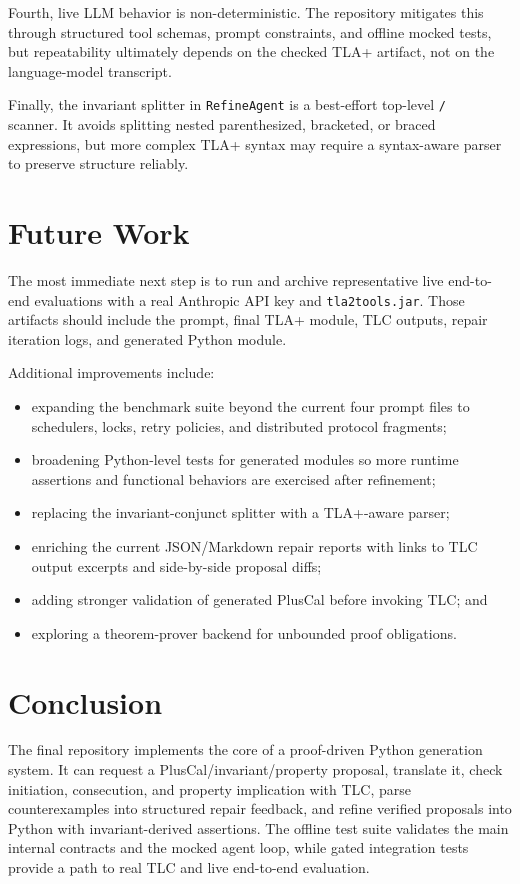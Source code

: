 \documentclass[11pt]{article}
\begin{document}
Fourth, live LLM behavior is non-deterministic. The repository mitigates this
through structured tool schemas, prompt constraints, and offline mocked tests,
but repeatability ultimately depends on the checked TLA+ artifact, not on the
language-model transcript.

Finally, the invariant splitter in \texttt{RefineAgent} is a best-effort
top-level \texttt{/\\} scanner. It avoids splitting nested parenthesized,
bracketed, or braced expressions, but more complex TLA+ syntax may require a
syntax-aware parser to preserve structure reliably.

\section{Future Work}

The most immediate next step is to run and archive representative live
end-to-end evaluations with a real Anthropic API key and \texttt{tla2tools.jar}.
Those artifacts should include the prompt, final TLA+ module, TLC outputs,
repair iteration logs, and generated Python module.

Additional improvements include:

\begin{itemize}[leftmargin=*]
  \item expanding the benchmark suite beyond the current four prompt files to
  schedulers, locks, retry policies, and distributed protocol fragments;
  \item broadening Python-level tests for generated modules so more runtime
  assertions and functional behaviors are exercised after refinement;
  \item replacing the invariant-conjunct splitter with a TLA+-aware parser;
  \item enriching the current JSON/Markdown repair reports with links to TLC
  output excerpts and side-by-side proposal diffs;
  \item adding stronger validation of generated PlusCal before invoking TLC;
  and
  \item exploring a theorem-prover backend for unbounded proof obligations.
\end{itemize}

\section{Conclusion}

The final repository implements the core of a proof-driven Python generation
system. It can request a PlusCal/invariant/property proposal, translate it,
check initiation, consecution, and property implication with TLC, parse
counterexamples into structured repair feedback, and refine verified proposals
into Python with invariant-derived assertions. The offline test suite validates
the main internal contracts and the mocked agent loop, while gated integration
tests provide a path to real TLC and live end-to-end evaluation.
\end{document}
